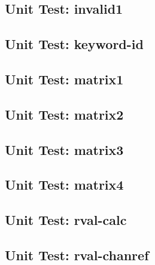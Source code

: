 \subsection*{Unit Test: invalid1}

 \clearpage
\subsection*{Unit Test: keyword-id}

 \clearpage
\subsection*{Unit Test: matrix1}

 \clearpage
\subsection*{Unit Test: matrix2}

 \clearpage
\subsection*{Unit Test: matrix3}

 \clearpage
\subsection*{Unit Test: matrix4}

 \clearpage
\subsection*{Unit Test: rval-calc}

 \clearpage
\subsection*{Unit Test: rval-chanref}

 \clearpage
